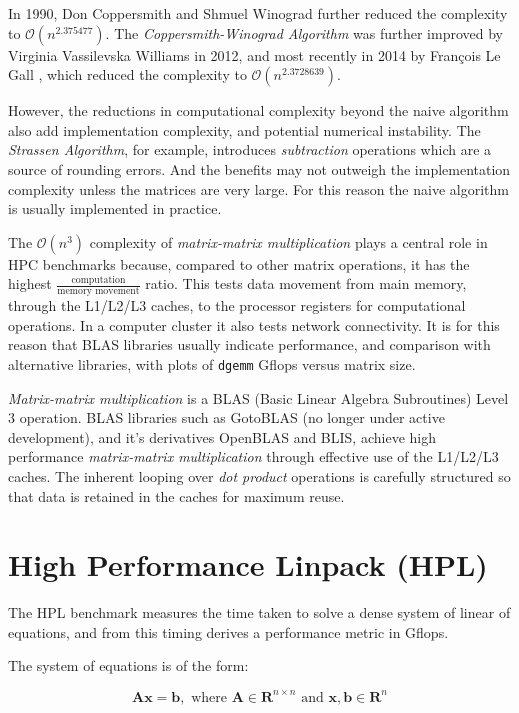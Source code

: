 In 1990, Don Coppersmith and Shmuel Winograd \cite{coppersmith-winograd} further reduced the complexity to $\mathcal{O}(n^{2.375477})$. The \emph{Coppersmith-Winograd Algorithm} was further improved by Virginia Vassilevska Williams \cite{williams} in 2012, and most recently in 2014 by François Le Gall \cite{le-gall}, which reduced the complexity to $\mathcal {O}(n^{2.3728639})$.

However, the reductions in computational complexity beyond the naive algorithm also add implementation complexity, and potential numerical instability. The \emph{Strassen Algorithm}, for example, introduces \emph{subtraction} operations which are a source of rounding errors. And the benefits may not outweigh the implementation complexity unless the matrices are very large. For this reason the naive algorithm is usually implemented in practice.    

The $\mathcal{O}(n^3)$ complexity of \emph{matrix-matrix multiplication} plays a central role in HPC benchmarks because, compared to other matrix operations, it has the highest $\frac{\text{computation}}{\text{memory movement}}$ ratio. This tests data movement from main memory, through the L1/L2/L3 caches, to the processor registers for computational operations. In a computer cluster it also tests network connectivity. It is for this reason that BLAS libraries usually indicate performance, and comparison with alternative libraries, with plots of \verb|dgemm| Gflops versus matrix size.

\emph{Matrix-matrix multiplication} is a BLAS (Basic Linear Algebra Subroutines) Level 3 operation. BLAS libraries such as GotoBLAS (no longer under active development), and it's derivatives OpenBLAS and BLIS, achieve high performance \emph{matrix-matrix multiplication} through effective use of the L1/L2/L3 caches. The inherent looping over \emph{dot product} operations is carefully structured so that data is retained in the caches for maximum reuse.     

%
%
\section{High Performance Linpack (HPL)}

The HPL benchmark \cite{linpack-ppf} measures the time taken to solve a dense system of linear of equations, and from this timing derives a performance metric in Gflops. 

The system of equations is of the form:

\begin{equation}
\mathbf{Ax} = \mathbf{b},\text{ where }\mathbf{A} \in \mathbf{R}^{n\times n}\text{ and }\mathbf{x}, \mathbf{b} \in \mathbf{R}^n
\end{equation} 

